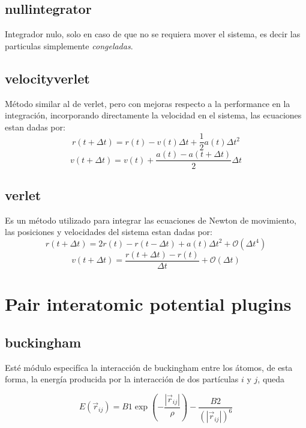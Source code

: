 \subsection{nullintegrator}
Integrador nulo, solo en caso de que no se requiera mover el sistema, es decir
las particulas simplemente \textit{congeladas}.

\subsection{velocityverlet}
M\'etodo similar al de verlet, pero con mejoras respecto a la performance en la
integraci\'on, incorporando directamente la velocidad en el sistema, las
ecuaciones estan dadas por:
$$r(t+\Delta t) = r(t) - v(t)\Delta t + \frac{1}{2}a(t)\Delta t^2$$
$$v(t+\Delta t) = v(t) + \frac{a(t) - a(t + \Delta t)}{2}\Delta t$$

\subsection{verlet}
Es un m\'etodo utilizado para integrar las ecuaciones de Newton de movimiento,
las posiciones y velocidades del sistema estan dadas por:
$$r(t+\Delta t) = 2r(t) - r(t-\Delta t) + a(t)\Delta t^2 + \mathcal{O}(\Delta t^4)$$
$$v(t+\Delta t) = \frac{r(t+\Delta t) - r(t)}{\Delta t} + \mathcal{O}(\Delta t)$$



\section{Pair interatomic potential plugins}
\subsection{buckingham}

Est\'e m\'odulo especif\'ica la interacci\'on de buckingham entre los \'atomos,
de esta forma, la energ\'ia producida por la interacci\'on de dos part\'iculas
$i$ y $j$, queda

$$E(\vec{r}_{ij}) = B1 \exp\left(-\frac{|\vec{r}_{ij}|}{\rho}\right) -
\frac{B2}{(|\vec{r}_{ij}|)^6}$$

